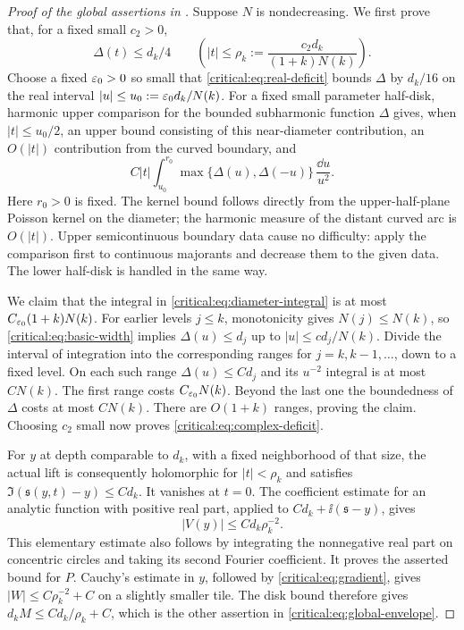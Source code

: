 \begin{proof}[Proof of the global assertions in
  ]
Suppose \(N\) is nondecreasing. We first prove that, for a fixed
small \(c_2>0\),
\begin{equation}\label{critical:eq:complex-deficit}
 \Delta(t)\le d_k/4\qquad
 \left(|t|\le \rho_k:=\frac{c_2d_k}{(1+k)N(k)}\right).
\end{equation}
Choose a fixed \(\varepsilon_0>0\) so small that
\eqref{critical:eq:real-deficit} bounds \(\Delta\) by \(d_k/16\)
on the real interval \(|u|\le u_0:=\varepsilon_0d_k/N(k)\).
For a fixed small parameter half-disk, harmonic upper comparison for
the bounded subharmonic function \(\Delta\) gives, when
\(|t|\le u_0/2\), an upper bound consisting of this near-diameter
contribution, an \(O(|t|)\) contribution from the curved boundary,
and
\begin{equation}\label{critical:eq:diameter-integral}
 C|t|\int_{u_0}^{r_0}
         \max\{\Delta(u),\Delta(-u)\}\,\frac{\dd u}{u^2}.
\end{equation}
Here \(r_0>0\) is fixed. The kernel bound follows directly from the
upper-half-plane Poisson kernel on the diameter; the harmonic measure
of the distant curved arc is \(O(|t|)\). Upper semicontinuous
boundary data cause no difficulty: apply the comparison first to
continuous majorants and decrease them to the given data. The lower
half-disk is handled in the same way.

We claim that the integral in \eqref{critical:eq:diameter-integral}
is at most \(C_{\varepsilon_0}(1+k)N(k)\). For earlier levels \(j\le k\),
monotonicity gives \(N(j)\le N(k)\), so
\eqref{critical:eq:basic-width} implies
\(\Delta(u)\le d_j\) up to \(|u|\le c d_j/N(k)\).
Divide the interval of integration into the corresponding ranges
for \(j=k,k-1,\ldots\), down to a fixed level. On each such range
\(\Delta(u)\le C d_j\) and its \(u^{-2}\) integral is at most
\(C N(k)\). The first range costs \(C_{\varepsilon_0}N(k)\).
Beyond the last one the boundedness of \(\Delta\) costs at most
\(C N(k)\). There are \(O(1+k)\) ranges, proving the claim.
Choosing \(c_2\) small now proves
\eqref{critical:eq:complex-deficit}.

For \(y\) at depth comparable to \(d_k\), with a fixed neighborhood
of that size, the actual lift is consequently holomorphic for
\(|t|<\rho_k\) and satisfies
\(\Im(\mathfrak s(y,t)-y)\le C d_k\). It vanishes at \(t=0\).
The coefficient estimate for an analytic function with positive real
part, applied to \(C d_k+\ii(\mathfrak s-y)\), gives
\[
 |V(y)|\le C d_k\rho_k^{-2}.
\]
This elementary estimate also follows by integrating the nonnegative
real part on concentric circles and taking its second Fourier
coefficient. It proves the asserted bound for \(P\).
Cauchy's estimate in \(y\), followed by
\eqref{critical:eq:gradient}, gives \(|W|\le C\rho_k^{-2}+C\)
on a slightly smaller tile. The disk bound therefore gives
\(d_kM\le C d_k/\rho_k+C\), which is the other assertion in
\eqref{critical:eq:global-envelope}.
\end{proof}

